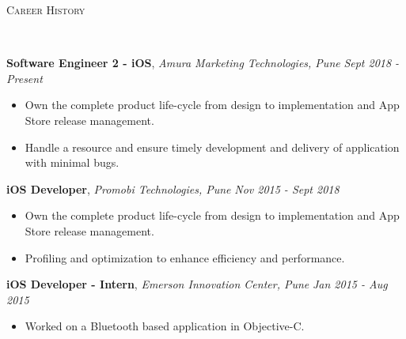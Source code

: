 \documentclass[9pt]{article}
\newenvironment{changemargin}[2]{%
  \begin{list}{}{%
    \setlength{\topsep}{0pt}%
    \setlength{\leftmargin}{#1}%
    \setlength{\rightmargin}{#2}%
    \setlength{\listparindent}{\parindent}%
    \setlength{\itemindent}{\parindent}%
    \setlength{\parsep}{\parskip}%
  }%
  \item[]}{\end{list}
}
\newcommand{\lineover}{
    \begin{changemargin}{-0.05in}{-0.05in}
        \vspace*{-8pt}
        \hrulefill \\
        \vspace*{-2pt}
    \end{changemargin}
}
\newcommand{\header}[1]{
    \begin{changemargin}{-0.5in}{-0.5in}
        \scshape{#1}\\
    \lineover
    \end{changemargin}
}
\newenvironment{body} {
    \vspace*{-16pt}
    \begin{changemargin}{-0.25in}{-0.5in}
  }
    {\end{changemargin}
}
\begin{document}
\header{Career History}

\begin{body}
    \vspace{14pt}
    \textbf{Software Engineer 2 - iOS}, \emph{Amura Marketing Technologies, Pune} \hfill \emph{Sept 2018 - Present}\\
    \begin{itemize} \itemsep -0pt  %
        \item Own the complete product life-cycle from design to implementation and App Store release management.
    \end{itemize}
    \begin{itemize} \itemsep -0pt  %
        \item Handle a resource and ensure timely development and delivery of application with minimal bugs.
    \end{itemize}
    \vspace*{-4pt}

    \vspace{14pt}
    \textbf{iOS Developer}, \emph{Promobi Technologies, Pune} \hfill \emph{Nov 2015 - Sept 2018}\\
    \begin{itemize} \itemsep -0pt  %
        \item Own the complete product life-cycle from design to implementation and App Store release management.
    \end{itemize}
    \begin{itemize} \itemsep -0pt  %
        \item Profiling and optimization to enhance efficiency and performance.
    \end{itemize}
    \vspace*{-4pt}

    \vspace{14pt}
    \textbf{iOS Developer - Intern}, \emph{Emerson Innovation Center, Pune} \hfill \emph{Jan 2015 - Aug 2015}\\
    \vspace*{-4pt}
    \begin{itemize} \itemsep -0pt  %
        \item Worked on a Bluetooth based application in Objective-C.
    \end{itemize}

\end{body}
\end{document}
